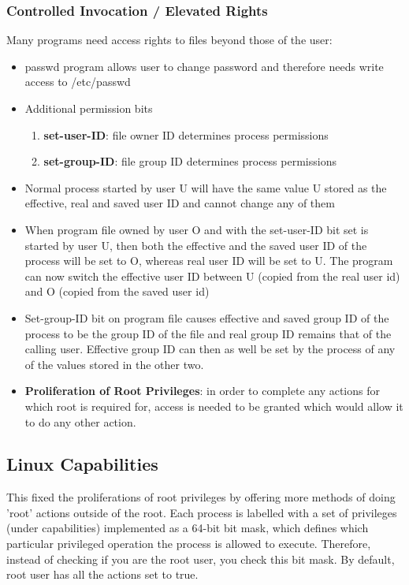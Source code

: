 \documentclass{article}
\newenvironment{cons}{\par\color{red}}{\par}
\newenvironment{example}{\par\color{brown}}{\par}
\begin{document}
\subsubsection{Controlled Invocation / Elevated Rights}
Many programs need access rights to files beyond those of the user:
\begin{itemize}
	\begin{example}
	\item passwd program allows user to change password and therefore needs write access to /etc/passwd
	\end{example}
	\item Additional permission bits
	\begin{enumerate}
		\item \textbf{set-user-ID}: file owner ID determines process permissions
		\item \textbf{set-group-ID}: file group ID determines process permissions
	\end{enumerate}

	\item Normal process started by user U will have the same value U stored as the effective, real and saved user ID and cannot change any of them
	
	\item When program file owned by user O and with the set-user-ID bit set is started by user U, then both the effective and the saved user ID of the process will be set to O, whereas real user ID will be set to U. The program can now switch the effective user ID between U (copied from the real user id) and O (copied from the saved user id)
	
	\item Set-group-ID bit on program file causes effective and saved group ID of the process to be the group ID of the file and real group ID remains that of the calling user. Effective group ID can then as well be set by the process of any of the values stored in the other two.
	
	\begin{cons}
		\item \textbf{Proliferation of Root Privileges}: in order to complete any actions for which root is required for, access is needed to be granted which would allow it to do any other action.
	\end{cons}
\end{itemize} 

\subsection{Linux Capabilities}
This fixed the proliferations of root privileges by offering more methods of doing 'root' actions outside of the root. Each process is labelled with a set of privileges (under capabilities) implemented as a 64-bit bit mask, which defines which particular privileged operation the process is allowed to execute. Therefore, instead of checking if you are the root user, you check this bit mask. By default, root user has all the actions set to true.
\end{document}
